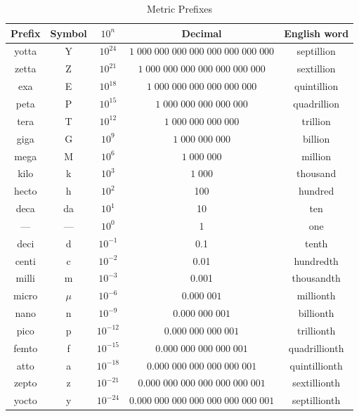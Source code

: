 \begin{sidewaystable}[h]
	\centering
	\caption{Metric Prefixes}
	\begin{tabular}{ccccc}
	\hline
	Prefix	&	Symbol	&	$10^n$	&	Decimal	&	English word	\\
	\hline\hline
	yotta	&	Y	&	 $10^{24}$	&	$1 \; 000 \; 000 \; 000 \; 000 \; 000 \; 000 \; 000 \; 000$\phantom{$1 \; 000 \; 000 \; 000 \; 000 \; 000 \; 000 \; 000 \; 00$}	&	septillion	\\
	zetta	&	Z	&	 $10^{21}$	&	$1 \; 000 \; 000 \; 000 \; 000 \; 000 \; 000 \; 000$\phantom{$1 \; 000 \; 000 \; 000 \; 000 \; 000 \; 000 \; 00$}	&	sextillion	\\
	exa	&	E	&	 $10^{18}$	&	$1 \; 000 \; 000 \; 000 \; 000 \; 000 \; 000$\phantom{$1 \; 000 \; 000 \; 000 \; 000 \; 000 \; 00$}	&	quintillion	\\
	peta	&	P	&	 $10^{15}$	&	$1 \; 000 \; 000 \; 000 \; 000 \; 000$\phantom{$1 \; 000 \; 000 \; 000 \; 000 \; 00$}	&	quadrillion	\\
	tera	&	T	&	 $10^{12}$	&	$1 \; 000 \; 000 \; 000 \; 000$\phantom{$1 \; 000 \; 000 \; 000 \; 00$}	&	trillion	\\
	giga	&	G	&	 $10^9$	&	$1 \; 000 \; 000 \; 000$\phantom{$1 \; 000 \; 000 \; 00$}	&	billion	\\
	mega	&	M	&	$10^6$	&	$1 \; 000 \; 000$\phantom{$1 \; 000 \; 00$}	&	million	\\
	kilo	&	k	&	$10^3$	&	$1 \; 000$\phantom{$1 \; 00$}	&	thousand	\\
	hecto	&	h	&	$10^2$	&	100\phantom{10}	&	hundred	\\
	deca	&	da	&	$10^1$	&	10\phantom{1}	&	ten	\\
	---	&	---	&	$10^0$	&	1	&	one	\\
	deci	&	d	&	$10^{-1}$	&	\phantom{1.}0.1	&	tenth	\\
	centi	&	c	&	$10^{-2}$	&	\phantom{01.}0.01	&	hundredth	\\
	milli	&	m	&	$10^{-3}$	&	\phantom{001.}0.001	&	thousandth	\\
	micro	&	$\mu$	&	$10^{-6}$	&	\phantom{00000\;1.}$0.000 \; 001$	&	millionth	\\
	nano	&	n	&	$10^{-9}$	&	\phantom{000\;000\;001.}$0.000 \; 000 \; 001$	&	billionth	\\
	pico	&	p	&	$10^{-12}$	&	\phantom{000\;000\;000\;001.}$0.000 \; 000 \; 000 \; 001$	&	trillionth	\\
	femto	&	f	&	$10^{-15}$	&	\phantom{000\;000\;000\;000\;001.}$0.000 \; 000 \; 000 \; 000 \; 001$	&	quadrillionth	\\
	atto	&	a	&	$10^{-18}$	&	\phantom{000\;000\;000\;000\;000\;001.}$0.000 \; 000 \; 000 \; 000 \; 000 \; 001$	&	quintillionth	\\
	zepto	&	z	&	$10^{-21}$	&	\phantom{000\;000\;000\;000\;000\;000\;001.}$0.000 \; 000 \; 000 \; 000 \; 000 \; 000 \; 001$	&	sextillionth	\\
	yocto	&	y	&	$10^{-24}$	&	\phantom{000\;000\;000\;000\;000\;000\;000\;001.}$0.000 \; 000 \; 000 \; 000 \; 000 \; 000 \; 000 \; 001$	&	septillionth	\\
	\hline
	\end{tabular}
\end{sidewaystable}